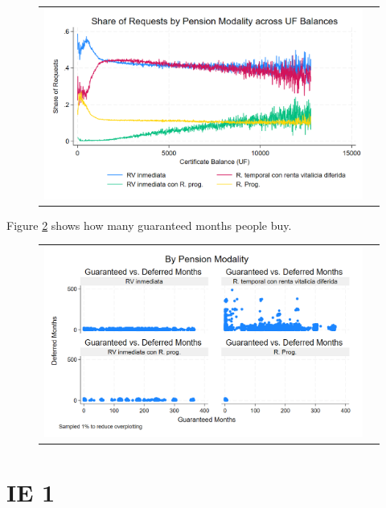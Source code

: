 \documentclass[12pt]{article}
\begin{document}
\begin{figure}[H] 
\caption{}
\label{fig:ie0_4}
\centering{}%
\begin{tabular}{cc}
\includegraphics[scale=0.27]{figures/IE0_plot4.png}
\end{tabular}
\end{figure}

Figure \ref{fig:ie0_5} shows how many guaranteed months people buy. 
\begin{figure}[H] 
\caption{}
\label{fig:ie0_5}
\centering{}%
\begin{tabular}{cc}
\includegraphics[scale=0.27]{figures/IE0_plot5.png}
\end{tabular}
\end{figure}

\section{IE 1}
\end{document}
